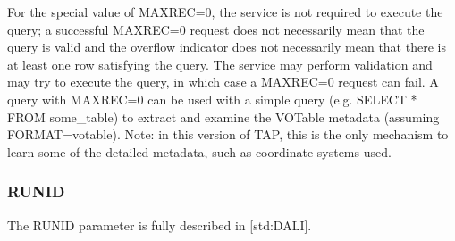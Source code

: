 \documentclass[11pt,letter]{ivoa}
\begin{document}
For the special value of MAXREC=0, the service is not required to execute the 
query; a successful  MAXREC=0 request does not necessarily mean that the query 
is valid and the overflow indicator does not necessarily mean that there is at 
least one row satisfying the query. The service may perform validation and may 
try to execute the query, in which case a MAXREC=0 request can fail. A query 
with MAXREC=0 can be used with a simple query (e.g. SELECT * FROM  
some\_table) to extract and examine the VOTable metadata (assuming 
FORMAT=votable). Note: in this version of TAP, this is the only mechanism to 
learn some of the detailed metadata, such as coordinate systems used.

\subsubsection{RUNID}
The RUNID parameter is fully described in [std:DALI].
\end{document}
